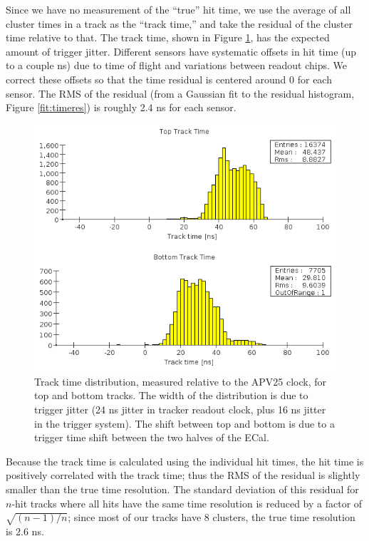 Since we have no measurement of the ``true'' hit time, we use the average of all cluster times in a track as the ``track time,'' and take the residual of the cluster time relative to that.
The track time, shown in Figure \ref{fig:tracktime}, has the expected amount of trigger jitter.
Different sensors have systematic offsets in hit time (up to a couple ns) due to time of flight and variations between readout chips. 
We correct these offsets so that the time residual is centered around 0 for each sensor. The RMS of the residual (from a Gaussian fit to the residual histogram, Figure \ref{fit:timeres}) is roughly 2.4 ns for each sensor.

\begin{figure}[ht]
	\includegraphics[width=\textwidth]{test2012/svtperformance/track_time}
	\caption{\small{Track time distribution, measured relative
	to the APV25 clock, for top and bottom tracks. The
width of the distribution is due to trigger jitter (24 ns
jitter in tracker readout clock, plus 16 ns jitter in the
trigger system). The shift between top and bottom
is due to a trigger time shift between the two halves
of the ECal.} }
	\label{fig:tracktime}
\end{figure}


Because the track time is calculated using the individual hit times, the hit time is positively correlated with the track time; thus the RMS of the residual is slightly smaller than the true time resolution.
The standard deviation of this residual for $n$-hit tracks where all hits have the same time resolution is reduced by a factor of $\sqrt{(n-1)/n}$; since most of our tracks have 8 clusters, the true time resolution is 2.6 ns. 

